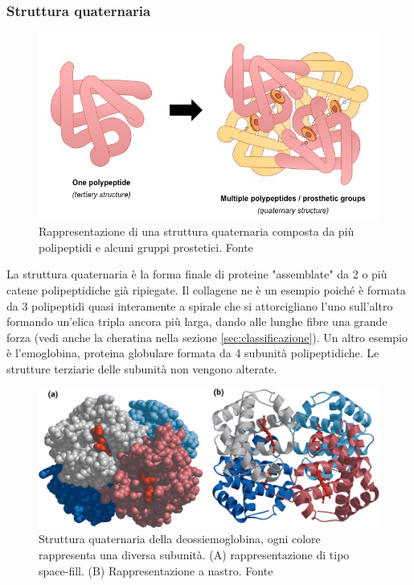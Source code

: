 {\subsubsection{Struttura quaternaria}
{
\begin{figure}[!htb]
	\centering
	\includegraphics[scale=0.35]{images/quaternary-structure_med.jpeg}
	\caption{Rappresentazione di una struttura quaternaria composta da più polipeptidi e alcuni gruppi prostetici. Fonte \cite{proteinStrucBioNinja}}
	\label{fig:struttura-quaternaria}
\end{figure}

La struttura quaternaria è la forma finale di proteine "assemblate" da 2 o più catene polipeptidiche già ripiegate. Il collagene ne è un esempio poiché è formata da 3 polipeptidi quasi interamente a spirale che si attorcigliano l'uno sull'altro formando un'elica tripla ancora più larga, dando alle lunghe fibre una grande forza (vedi anche la cheratina nella sezione \ref{sec:classificazione}). Un altro esempio è l'emoglobina, proteina globulare formata da 4 subunità polipeptidiche. Le strutture terziarie delle subunità non vengono alterate.

\begin{figure}[!htb]
	\centering
	\includegraphics[scale=0.5]{images/quate-deossi.png}
	\caption{Struttura quaternaria della deossiemoglobina, ogni colore rappresenta una diversa subunità. (A) rappresentazione di tipo space-fill. (B) Rappresentazione a nastro. Fonte \cite{moran2012principles}}
	\label{fig:quate-deossi}
\end{figure}

}}
